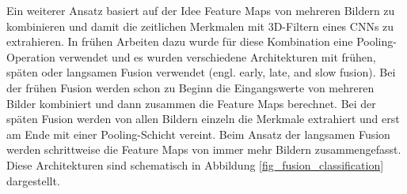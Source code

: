 Ein weiterer Ansatz basiert auf der Idee Feature Maps von mehreren Bildern zu kombinieren und damit die zeitlichen Merkmalen mit 3D-Filtern eines \acp{CNN} zu extrahieren. In frühen Arbeiten dazu wurde für diese Kombination eine Pooling-Operation verwendet \cite{karpathy2014large, yue2015beyond} und es wurden verschiedene Architekturen mit frühen, späten oder langsamen Fusion verwendet (engl. early, late, and slow fusion). Bei der frühen Fusion werden schon zu Beginn die Eingangswerte von mehreren Bilder kombiniert und dann zusammen die Feature Maps berechnet. Bei der späten Fusion werden von allen Bildern einzeln die Merkmale extrahiert und erst am Ende mit einer Pooling-Schicht vereint. Beim Ansatz der langsamen Fusion werden schrittweise die Feature Maps von immer mehr Bildern zusammengefasst. Diese Architekturen sind schematisch in Abbildung \ref{fig_fusion_classification} dargestellt.

